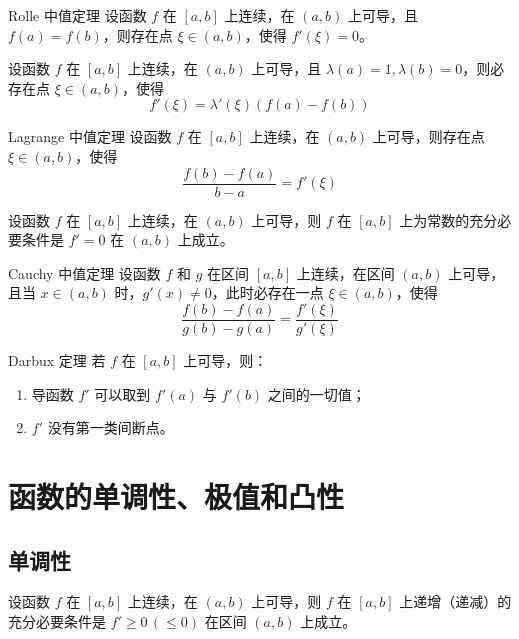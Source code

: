 \begin{theorem}{Rolle 中值定理}
  设函数 $f$ 在 $[a,b]$ 上连续，在 $(a,b)$ 上可导，且 $f(a) = f(b)$，则存在点 $\xi \in (a,b)$，使得 $f'(\xi) = 0$。
\end{theorem}

\begin{lemma}
  设函数 $f$ 在 $[a,b]$ 上连续，在 $(a,b)$ 上可导，且 $\lambda(a) = 1, \lambda(b) = 0$，则必存在点 $\xi \in (a,b)$，使得
  \[f'(\xi) = \lambda'(\xi)(f(a) - f(b))\]
\end{lemma}

\begin{theorem}{Lagrange 中值定理}
  设函数 $f$ 在 $[a,b]$ 上连续，在 $(a,b)$ 上可导，则存在点 $\xi \in (a,b)$，使得
  \[\frac{f(b) - f(a)}{b - a} = f'(\xi)\]
\end{theorem}

\begin{corollary}
  设函数 $f$ 在 $[a,b]$ 上连续，在 $(a,b)$ 上可导，则 $f$ 在 $[a,b]$ 上为常数的充分必要条件是 $f' = 0$ 在 $(a,b)$ 上成立。
\end{corollary}

\begin{theorem}{Cauchy 中值定理}
  设函数 $f$ 和 $g$ 在区间 $[a,b]$ 上连续，在区间 $(a,b)$ 上可导，且当 $x \in (a,b)$ 时，$g'(x) \ne 0$，此时必存在一点 $\xi \in (a,b)$，使得
  \[\frac{f(b) - f(a)}{g(b) - g(a)} = \frac{f'(\xi)}{g'(\xi)}\]
\end{theorem}

\begin{theorem}{Darbux 定理}
  若 $f$ 在 $[a,b]$ 上可导，则：
  \begin{enumerate}
    \item 导函数 $f'$ 可以取到 $f'(a)$ 与 $f'(b)$ 之间的一切值；
    \item $f'$ 没有第一类间断点。
  \end{enumerate}
\end{theorem}





\section{函数的单调性、极值和凸性}
\subsection{单调性}

\begin{theorem}
  设函数 $f$ 在 $[a,b]$ 上连续，在 $(a,b)$ 上可导，则 $f$ 在 $[a,b]$ 上递增（递减）的充分必要条件是 $f' \geqslant 0\, (\leqslant 0)$ 在区间 $(a,b)$ 上成立。
\end{theorem}

